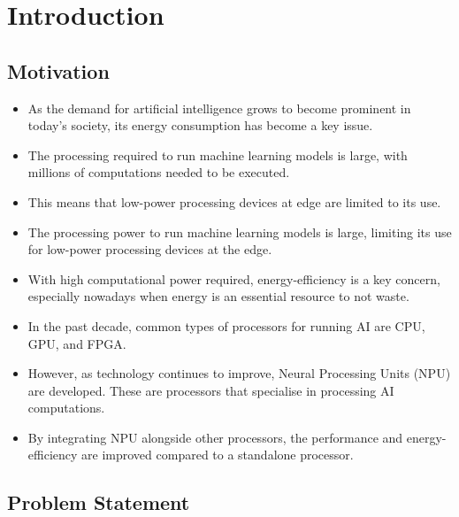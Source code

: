 \documentclass[12pt, a4paper, ukenglish]{article}
\begin{document}
\section{Introduction} \label{sec: intro}
    \subsection{Motivation}

    \begin{itemize}
        \item As the demand for artificial intelligence grows to become prominent in today's society, its energy consumption has become a key issue. 
        \item The processing required to run machine learning models is large, with millions of computations needed to be executed. 
        \item This means that low-power processing devices at edge are limited to its use. 
        \item The processing power to run machine learning models is large, limiting its use for low-power processing devices at the edge.  
        \item With high computational power required, energy-efficiency is a key concern, especially nowadays when energy is an essential resource to not waste.
        \item In the past decade, common types of processors for running AI are CPU, GPU, and FPGA. 
        \item However, as technology continues to improve, Neural Processing Units (NPU) are developed. These are processors that specialise in processing AI computations.
        \item By integrating NPU alongside other processors, the performance and energy-efficiency are improved compared to a standalone processor. 
    \end{itemize}
    
    \subsection{Problem Statement}
\end{document}
